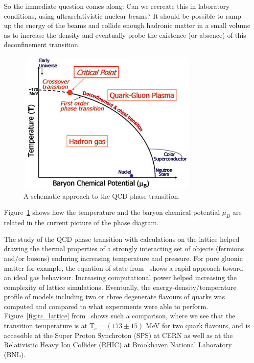 So the immediate question comes along: Can we recreate this in laboratory
conditions, using ultrarelativistic nuclear beams? It should be
possible to ramp up the energy of the beams and collide enough
hadronic matter in a small volume as to increase the density and
eventually probe the existence (or absence) of this deconfinement
transition.

\begin{figure}[h]
\begin{center}
  \includegraphics[width=0.8\textwidth]{Chapters/pQCD/phase.jpg}
 \caption{A schematic approach to the QCD phase transition.}
 \label{fig:transition}
\end{center}
\end{figure}

Figure~\ref{fig:transition} shows how the temperature and the baryon
chemical potential $\mu_{B}$ are related in the current picture of the phase
diagram. 

The study of the QCD phase transition with calculations on the lattice
helped drawing the thermal properties of a strongly interacting set of
objects (fermions and/or bosons) enduring increasing temperature and
pressure. For pure gluonic matter for example, the equation of state
from~\cite{lattice_g} shows a rapid approach toward an ideal gas
behaviour.
Increasing computational power helped increasing the complexity of
lattice simulations. Eventually, the energy-density/temperature
profile of models including two or three degenerate flavours of quarks
was computed and compared to what experiments were able to
perform. Figure~\ref{fig:tc_lattice} from~\cite{Karsch:2001cy} shows
such a comparison, where we 
see that the transition temperature is at T$_{c} = (173 \pm 15)$ MeV
for two quark flavours, and is accessible at the Super Proton
Synchroton (SPS) at CERN as well as at the
Relativistic Heavy Ion Collider (RHIC) at Brookhaven National
Laboratory (BNL).


